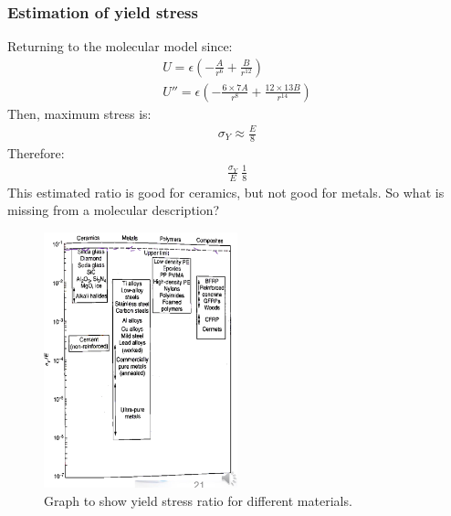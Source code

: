 \subsubsection{Estimation of yield stress}
Returning to the molecular model since:
\begin{gather}
	U = \epsilon \left(-\frac{A}{r^6} + \frac{B}{r^{12}}\right)\\
	U'' = \epsilon \left(- \frac{6\times 7A}{r^8} + \frac{12\times 13B}{r^{14}}\right)
\end{gather}
Then, maximum stress is:
\begin{gather}
	\sigma_Y \approx \frac{E}{8}
\end{gather}
Therefore:
\begin{gather}
	\frac{\sigma_Y}{E} ~ \frac{1}{8}
\end{gather}
This estimated ratio is good for ceramics, but not good for metals. So what is missing from a molecular description?
\begin{figure}[H]
	\centering
	\includegraphics[width = 0.5\textwidth]{./img/figure13.png}
	\caption{Graph to show yield stress ratio for different materials.}
\end{figure}
